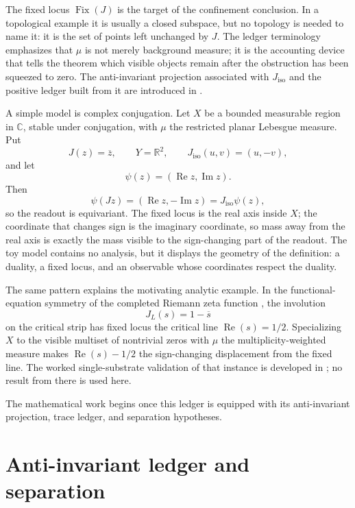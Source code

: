 \documentclass[11pt]{article}
\DeclareMathOperator{\Fix}{Fix}
\newcommand{\Jiso}{J_{\mathrm{iso}}}
\theoremstyle{definition}
\begin{document}
The fixed locus \(\Fix(J)\) is the target of the confinement
conclusion.  In a topological example it is usually a closed
subspace, but no topology is needed to name it: it is the set of
points left unchanged by \(J\).  The ledger terminology
emphasizes that \(\mu\) is not merely background measure; it is the
accounting device that tells the theorem which visible objects
remain after the obstruction has been squeezed to zero.  The
anti-invariant projection associated with \(\Jiso\) and the positive
ledger built from it are introduced in
.

A simple model is complex conjugation.  Let \(X\) be a bounded
measurable region in \(\mathbb{C}\), stable under conjugation, with
\(\mu\) the restricted planar Lebesgue measure.  Put
\[
  J(z)=\overline{z},\qquad
  Y=\mathbb{R}^2,\qquad
  \Jiso(u,v)=(u,-v),
\]
and let
\[
  \psi(z)=(\operatorname{Re}z,\operatorname{Im}z).
\]
Then
\[
  \psi(Jz)
  =
  (\operatorname{Re}z,-\operatorname{Im}z)
  =
  \Jiso\psi(z),
\]
so the readout is equivariant.  The fixed locus is the real axis
inside \(X\); the coordinate that changes sign is the imaginary
coordinate, so mass away from the real axis is exactly the mass
visible to the sign-changing part of the readout.  The toy model
contains no analysis, but it displays the geometry of the
definition: a duality, a fixed locus, and an observable whose
coordinates respect the duality.

The same pattern explains the motivating analytic example.  In the
functional-equation symmetry of the completed Riemann zeta function
\citep{TitchmarshHeathBrown1986}, the involution
\[
  J_L(s)=1-\overline{s}
\]
on the critical strip has fixed locus the critical line
\(\operatorname{Re}(s)=1/2\).  Specializing \(X\) to the visible
multiset of nontrivial zeros with \(\mu\) the multiplicity-weighted
measure makes \(\operatorname{Re}(s)-1/2\) the sign-changing
displacement from the fixed line.  The worked single-substrate
validation of that instance is developed in
\citet{TsiokosRHviaSDTC2026}; no result from there is used here.

The mathematical work begins once this ledger is equipped with its
anti-invariant projection, trace ledger, and separation hypotheses.
 

\section{Anti-invariant ledger and separation}
\label{sec:anti_invariant_ledger}
\end{document}
